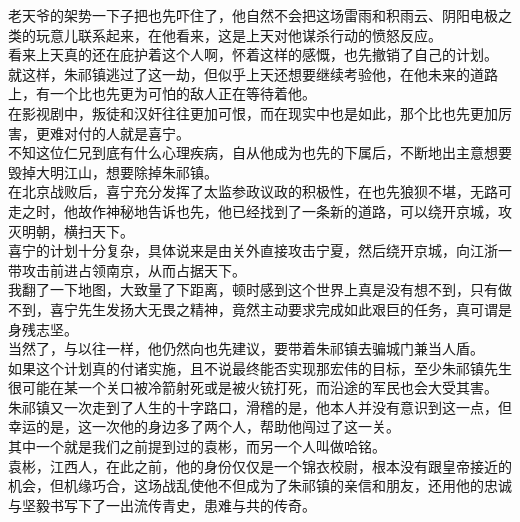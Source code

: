 \begin{multicols}{\theparacolNo}
老天爷的架势一下子把也先吓住了，他自然不会把这场雷雨和积雨云、阴阳电极之类的玩意儿联系起来，在他看来，这是上天对他谋杀行动的愤怒反应。\\

看来上天真的还在庇护着这个人啊，怀着这样的感慨，也先撤销了自己的计划。\\

就这样，朱祁镇逃过了这一劫，但似乎上天还想要继续考验他，在他未来的道路上，有一个比也先更为可怕的敌人正在等待着他。\\

在影视剧中，叛徒和汉奸往往更加可恨，而在现实中也是如此，那个比也先更加厉害，更难对付的人就是喜宁。\\

不知这位仁兄到底有什么心理疾病，自从他成为也先的下属后，不断地出主意想要毁掉大明江山，想要除掉朱祁镇。\\

在北京战败后，喜宁充分发挥了太监参政议政的积极性，在也先狼狈不堪，无路可走之时，他故作神秘地告诉也先，他已经找到了一条新的道路，可以绕开京城，攻灭明朝，横扫天下。\\

喜宁的计划十分复杂，具体说来是由关外直接攻击宁夏，然后绕开京城，向江浙一带攻击前进占领南京，从而占据天下。\\

我翻了一下地图，大致量了下距离，顿时感到这个世界上真是没有想不到，只有做不到，喜宁先生发扬大无畏之精神，竟然主动要求完成如此艰巨的任务，真可谓是身残志坚。\\

当然了，与以往一样，他仍然向也先建议，要带着朱祁镇去骗城门兼当人盾。\\

如果这个计划真的付诸实施，且不说最终能否实现那宏伟的目标，至少朱祁镇先生很可能在某一个关口被冷箭射死或是被火铳打死，而沿途的军民也会大受其害。\\

朱祁镇又一次走到了人生的十字路口，滑稽的是，他本人并没有意识到这一点，但幸运的是，这一次他的身边多了两个人，帮助他闯过了这一关。\\

其中一个就是我们之前提到过的袁彬，而另一个人叫做哈铭。\\

袁彬，江西人，在此之前，他的身份仅仅是一个锦衣校尉，根本没有跟皇帝接近的机会，但机缘巧合，这场战乱使他不但成为了朱祁镇的亲信和朋友，还用他的忠诚与坚毅书写下了一出流传青史，患难与共的传奇。\\


\end{multicols}

